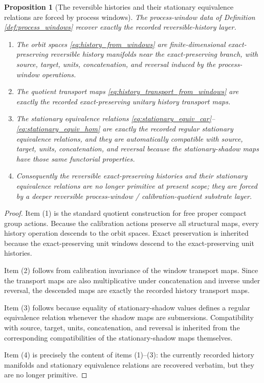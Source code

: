 \documentclass[11pt]{article}
\newtheorem{proposition}{Proposition}
\begin{document}
\begin{proposition}[The reversible histories and their stationary equivalence relations are forced by process windows]
\label{prop:histories_from_windows}
The process-window data of Definition \ref{def:process_windows} recover exactly the recorded reversible-history layer.
\begin{enumerate}
    \item The orbit spaces \eqref{eq:history_from_windows} are finite-dimensional exact-preserving reversible history manifolds near the exact-preserving branch, with source, target, units, concatenation, and reversal induced by the process-window operations.
    \item The quotient transport maps \eqref{eq:history_transport_from_windows} are exactly the recorded exact-preserving unitary history transport maps.
    \item The stationary equivalence relations \eqref{eq:stationary_equiv_car}--\eqref{eq:stationary_equiv_hom} are exactly the recorded regular stationary equivalence relations, and they are automatically compatible with source, target, units, concatenation, and reversal because the stationary-shadow maps have those same functorial properties.
    \item Consequently the reversible exact-preserving histories and their stationary equivalence relations are no longer primitive at present scope; they are forced by a deeper reversible process-window / calibration-quotient substrate layer.
\end{enumerate}
\end{proposition}

\begin{proof}
Item (1) is the standard quotient construction for free proper compact group actions. Because the calibration actions preserve all structural maps, every history operation descends to the orbit spaces. Exact preservation is inherited because the exact-preserving unit windows descend to the exact-preserving unit histories.

Item (2) follows from calibration invariance of the window transport maps. Since the transport maps are also multiplicative under concatenation and inverse under reversal, the descended maps are exactly the recorded history transport maps.

Item (3) follows because equality of stationary-shadow values defines a regular equivalence relation whenever the shadow maps are submersions. Compatibility with source, target, units, concatenation, and reversal is inherited from the corresponding compatibilities of the stationary-shadow maps themselves.

Item (4) is precisely the content of items (1)--(3): the currently recorded history manifolds and stationary equivalence relations are recovered verbatim, but they are no longer primitive.
\end{proof}
\end{document}
